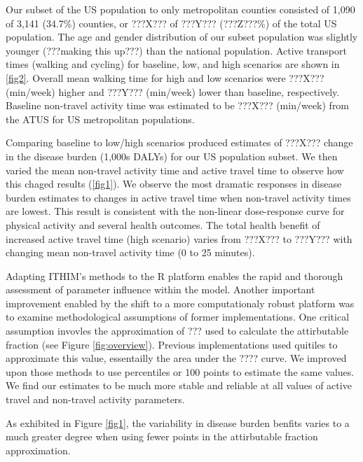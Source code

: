 Our subset of the US population to only metropolitan counties
consisted of 1,090 of 3,141 (34.7\%) counties, or ???X??? of ???Y???
(???Z???\%) of the total US population. The age and gender
distribution of our subset population was slightly younger (???making
this up???) than the national population. Active transport times
(walking and cycling) for baseline, low, and high scenarios are shown
in \ref{fig2}. Overall mean walking time for high and low
scenarios were ???X??? (min/week) higher and ???Y??? (min/week) lower
than baseline, respectively. Baseline non-travel activity time was
estimated to be ???X??? (min/week) from the ATUS for US metropolitan
populations.

Comparing baseline to low/high scenarios produced estimates of ???X???
change in the disease burden (1,000s DALYs) for our US population
subset. We then varied the mean non-travel activity time and active
travel time to observe how this chaged results (\ref{fig1}). We
observe the most dramatic responses in disease burden estimates to
changes in active travel time when non-travel activity times are
lowest. This result is consistent with the non-linear dose-response
curve for physical activity and several health outcomes. The total
health benefit of increased active travel time (high scenario) varies
from ???X??? to ???Y??? with changing mean non-travel activity time (0
to 25 minutes).

Adapting ITHIM's methods to the R platform enables the rapid and
thorough assessment of parameter influence within the model. Another
important improvement enabled by the shift to a more computationaly
robust platform was to examine methodological assumptions of former
implementations. One critical assumption invovles the approximation of
??? used to calculate the attirbutable fraction (see
Figure \ref{fig:overview}). Previous implementations used quitiles to
approximate this value, essentailly the area under the ???? curve. We
improved upon those methods to use percentiles or 100 points to
estimate the same values. We find our estimates to be much more stable
and reliable at all values of active travel and non-travel activity
parameters.

As exhibited in Figure \ref{fig1}, the variability in disease burden
benfits varies to a much greater degree when using fewer points in the
attirbutable fraction approximation.
